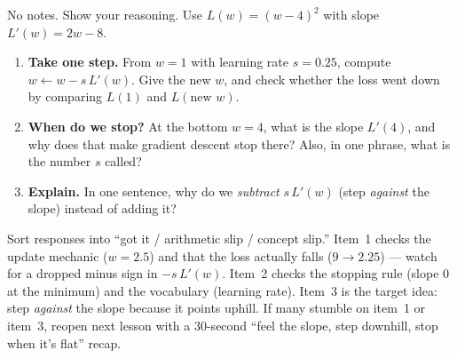 \documentclass[10pt]{article}
\begin{document}
\namedateperiod

\vspace{0.15in}

No notes. Show your reasoning. Use $L(w)=(w-4)^2$ with slope $L'(w)=2w-8$.

\begin{enumerate}[leftmargin=1.8em, itemsep=16pt]
  \item \textbf{Take one step.} From $w=1$ with learning rate $s=0.25$, compute $w\leftarrow w-s\,L'(w)$.
        Give the new $w$, and check whether the loss went down by comparing $L(1)$ and $L(\text{new }w)$.
  \item \textbf{When do we stop?} At the bottom $w=4$, what is the slope $L'(4)$, and why does that make
        gradient descent stop there? Also, in one phrase, what is the number $s$ called?
  \item \textbf{Explain.} In one sentence, why do we \emph{subtract} $s\,L'(w)$ (step \emph{against} the
        slope) instead of adding it?
\end{enumerate}

\begin{teachernote}
Sort responses into ``got it / arithmetic slip / concept slip.'' Item~1 checks the update mechanic
($w=2.5$) and that the loss actually falls ($9\to2.25$) --- watch for a dropped minus sign in $-s\,L'(w)$.
Item~2 checks the stopping rule (slope $0$ at the minimum) and the vocabulary (learning rate). Item~3 is the
target idea: step \emph{against} the slope because it points uphill. If many stumble on item~1 or item~3,
reopen next lesson with a 30-second ``feel the slope, step downhill, stop when it's flat'' recap.
\end{teachernote}
\end{document}
